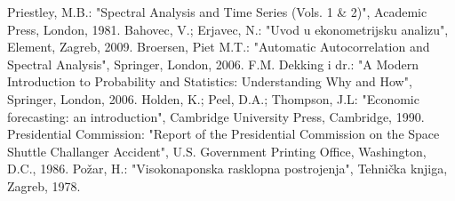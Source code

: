 \documentclass[a4paper,12pt,oneside]{memoir}
\begin{document}
    \begin{thebibliography}{9}
         Priestley, M.B.: "Spectral Analysis and Time Series (Vols. 1 \& 2)", Academic Press, London, 1981.
         Bahovec, V.; Erjavec, N.: "Uvod u ekonometrijsku analizu", Element, Zagreb, 2009.
         Broersen, Piet M.T.: "Automatic Autocorrelation and Spectral Analysis", Springer, London, 2006.
         F.M. Dekking i dr.: "A Modern Introduction to Probability and Statistics: Understanding Why and How", Springer, London, 2006.
         Holden, K.; Peel, D.A.; Thompson, J.L: "Economic forecasting: an introduction", Cambridge University Press, Cambridge, 1990.
         Presidential Commission: "Report of the Presidential Commission on the Space Shuttle Challanger Accident", U.S. Government Printing Office, Washington, D.C., 1986.
         Požar, H.: "Visokonaponska rasklopna postrojenja", Tehnička knjiga, Zagreb, 1978.
    \end{thebibliography}
\end{document}
